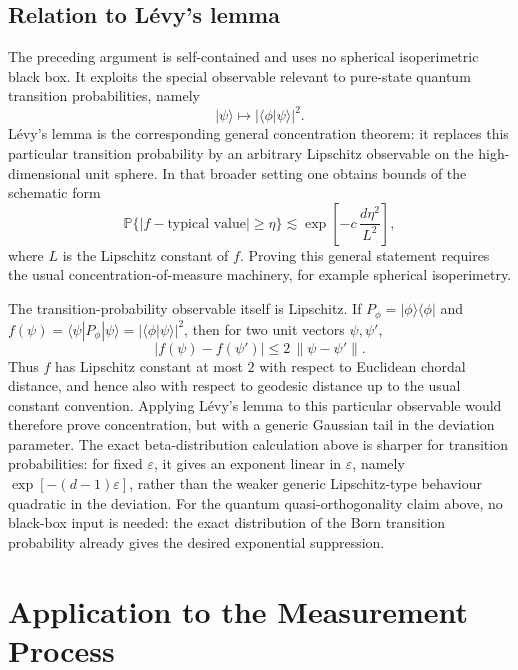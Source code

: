\documentclass[aps,pra,reprint,superscriptaddress,nofootinbib,longbibliography]{revtex4-2}
\newcommand{\bra}[1]{\langle #1 |}
\newcommand{\ket}[1]{| #1 \rangle}
\newcommand{\eps}{\varepsilon}
\newcommand{\PP}{\mathbb{P}}
\begin{document}
\subsection*{Relation to L\'evy's lemma}
\label{subsec:relation-to-levy}

The preceding argument is self-contained and uses no spherical isoperimetric
black box.  It exploits the special observable relevant to pure-state quantum
transition probabilities, namely
\begin{equation}
    \ket{\psi}\longmapsto |\langle\phi|\psi\rangle|^2 .
\end{equation}
L\'evy's lemma is the corresponding general concentration theorem: it replaces
this particular transition probability by an arbitrary Lipschitz observable on
the high-dimensional unit sphere.  In that broader setting one obtains bounds
of the schematic form
\begin{equation}
    \PP\{|f-\text{typical value}|\geq\eta\}
    \lesssim
    \exp\left[-c\,\frac{d\eta^2}{L^2}\right],
\end{equation}
where $L$ is the Lipschitz constant of $f$.  Proving this general statement
requires the usual concentration-of-measure machinery, for example spherical
isoperimetry.

The transition-probability observable itself is Lipschitz. If
$P_\phi=\ket{\phi}\bra{\phi}$ and
$f(\psi)=\bra{\psi}P_\phi\ket{\psi}=|\langle\phi|\psi\rangle|^2$, then for
two unit vectors $\psi,\psi'$,
\begin{equation}
    |f(\psi)-f(\psi')|
    \leq
    2\,\|\psi-\psi'\| .
\end{equation}
Thus $f$ has Lipschitz constant at most $2$ with respect to Euclidean chordal
distance, and hence also with respect to geodesic distance up to the usual
constant convention. Applying L\'evy's lemma to this particular observable
would therefore prove concentration, but with a generic Gaussian tail in the
deviation parameter.  The exact beta-distribution calculation above is sharper
for transition probabilities: for fixed $\eps$, it gives an exponent linear in
$\eps$, namely $\exp[-(d-1)\eps]$, rather than the weaker generic
Lipschitz-type behaviour quadratic in the deviation. For the quantum
quasi-orthogonality claim above, no black-box input is needed: the exact
distribution of the Born transition probability already gives the desired
exponential suppression.

\section{Application to the Measurement Process}
\end{document}
